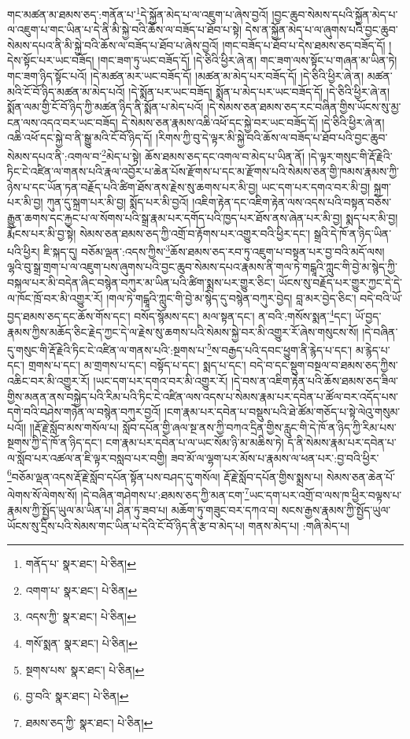 གང་མཚན་མ་ཐམས་ཅད་:གནོན་པ་\footnote{གནོད་པ་  སྣར་ཐང་།  པེ་ཅིན། }དེ་སྐྱོན་མེད་པ་ལ་འཇུག་པ་ཞེས་བྱའོ། །བྱང་ཆུབ་སེམས་དཔའི་སྐྱོན་མེད་པ་ལ་འཇུག་པ་གང་ཡིན་པ་དེ་ནི་མི་སྐྱེ་བའི་ཆོས་ལ་བཟོད་པ་ཐོབ་པ་སྟེ། དེས་ན་སྐྱོན་མེད་པ་ལ་ཞུགས་པའི་བྱང་ཆུབ་སེམས་དཔའ་ནི་མི་སྐྱེ་བའི་ཆོས་ལ་བཟོད་པ་ཐོབ་པ་ཞེས་བྱའོ། །གང་བཟོད་པ་ཐོབ་པ་དེས་ཐམས་ཅད་བཟོད་དོ། །དེས་སྟོང་པར་ཡང་བཟོད། །གང་ཟག་ཏུ་ཡང་བཟོད་དོ། །དེ་ཅིའི་ཕྱིར་ཞེ་ན། གང་ཟག་ལས་སྟོང་པ་གཞན་མ་ཡིན་ཏེ། གང་ཟག་ཉིད་སྟོང་པའོ། །དེ་མཚན་མར་ཡང་བཟོད་དོ། །མཚན་མ་མེད་པར་བཟོད་དོ། །དེ་ཅིའི་ཕྱིར་ཞེ་ན། མཚན་མའི་ངོ་བོ་ཉིད་མཚན་མ་མེད་པའོ། །དེ་སྨོན་པར་ཡང་བཟོད། སྨོན་པ་མེད་པར་ཡང་བཟོད་དོ། །དེ་ཅིའི་ཕྱིར་ཞེ་ན། སྨོན་ལམ་གྱི་ངོ་བོ་ཉིད་ཀྱི་མཚན་ཉིད་ནི་སྨོན་པ་མེད་པའོ། །དེ་སེམས་ཅན་ཐམས་ཅད་རང་བཞིན་གྱིས་ཡོངས་སུ་མྱ་ངན་ལས་འདའ་བར་ཡང་བཟོད། དེ་སེམས་ཅན་རྣམས་འཆི་འཕོ་དང་སྐྱེ་བར་ཡང་བཟོད་དོ། །དེ་ཅིའི་ཕྱིར་ཞེ་ན། འཆི་འཕོ་དང་སྐྱེ་བ་ནི་སྒྱུ་མའི་ངོ་བོ་ཉིད་དོ། །རིགས་ཀྱི་བུ་དེ་ལྟར་མི་སྐྱེ་བའི་ཆོས་ལ་བཟོད་པ་ཐོབ་པའི་བྱང་ཆུབ་སེམས་དཔའ་ནི་:འགལ་བ་\footnote{འགག་པ་  སྣར་ཐང་།  པེ་ཅིན། }མེད་པ་སྟེ། ཆོས་ཐམས་ཅད་དང་འགལ་བ་མེད་པ་ཡིན་ནོ། །དེ་ལྟར་གསུང་གི་རྡོ་རྗེའི་ཏིང་ངེ་འཛིན་ལ་གནས་པའི་རྣལ་འབྱོར་པ་ཆེན་པོས་རྫོགས་པ་དང་མ་རྫོགས་པའི་སེམས་ཅན་གྱི་ཁམས་རྣམས་ཀྱི་ཉེས་པ་དང་ཡོན་ཏན་བརྗོད་པའི་ཚིག་ཐོས་ནས་རྗེས་སུ་ཆགས་པར་མི་བྱ། ཡང་དག་པར་དགའ་བར་མི་བྱ། སྐྲག་པར་མི་བྱ། ཀུན་དུ་སྐྲག་པར་མི་བྱ། སྨོད་པར་མི་བྱའོ། །འཇིག་རྟེན་དང་འཇིག་རྟེན་ལས་འདས་པའི་བསྟན་བཅོས་རྒྱུན་ཆགས་དང་རྐྱང་པ་ལ་སོགས་པའི་སྒྲ་རྣམ་པར་དགོད་པའི་ཁྱད་པར་ཐོས་ནས་ཞེན་པར་མི་བྱ། སྨད་པར་མི་བྱ། རྨོངས་པར་མི་བྱ་སྟེ། སེམས་ཅན་ཐམས་ཅད་ཀྱི་འགྲོ་བ་རྟོགས་པར་འགྱུར་བའི་ཕྱིར་དང་། སྒྲའི་དེ་ཁོ་ན་ཉིད་ཡིན་པའི་ཕྱིར། ཇི་སྐད་དུ། བཅོམ་ལྡན་:འདས་ཀྱིས་\footnote{འདས་ཀྱི་  སྣར་ཐང་།  པེ་ཅིན། }ཆོས་ཐམས་ཅད་རབ་ཏུ་འཇུག་པ་བསྟན་པར་བྱ་བའི་མདོ་ལས། ལྷའི་བུ་སྒྲ་གྲག་པ་ལ་འཇུག་པས་ཞུགས་པའི་བྱང་ཆུབ་སེམས་དཔའ་རྣམས་ནི་གལ་ཏེ་གངྒཱའི་ཀླུང་གི་བྱེ་མ་སྙེད་ཀྱི་བསྐལ་པར་མི་བདེན་ཞིང་བསྙེན་བཀུར་མ་ཡིན་པའི་ཚིག་སྨྲས་པར་གྱུར་ཅིང་། ཡོངས་སུ་བརྗོད་པར་གྱུར་ཀྱང་དེ་དེ་ལ་ཁོང་ཁྲོ་བར་མི་འགྱུར་རོ། །གལ་ཏེ་གངྒཱའི་ཀླུང་གི་བྱེ་མ་སྙེད་དུ་བསྙེན་བཀུར་བྱེད། བླ་མར་བྱེད་ཅིང་། བདེ་བའི་ཡོ་བྱད་ཐམས་ཅད་དང་ཆོས་གོས་དང་། བསོད་སྙོམས་དང་། མལ་སྟན་དང་། ན་བའི་:གསོས་སྨན་\footnote{གསོ་སྨན་  སྣར་ཐང་།  པེ་ཅིན། }དང་། ཡོ་བྱད་རྣམས་ཀྱིས་མཆོད་ཅིང་རྗེད་ཀྱང་དེ་ལ་རྗེས་སུ་ཆགས་པའི་སེམས་སྐྱེ་བར་མི་འགྱུར་རོ་ཞེས་གསུངས་སོ། །དེ་བཞིན་དུ་གསུང་གི་རྡོ་རྗེའི་ཏིང་ངེ་འཛིན་ལ་གནས་པའི་:སྔགས་པ་\footnote{སྔགས་པས་  སྣར་ཐང་།  པེ་ཅིན། }ས་བརྒྱད་པའི་དབང་ཕྱུག་ནི་རྙེད་པ་དང་། མ་རྙེད་པ་དང་། གྲགས་པ་དང་། མ་གྲགས་པ་དང་། བསྟོད་པ་དང་། སྨད་པ་དང་། བདེ་བ་དང་སྡུག་བསྔལ་བ་ཐམས་ཅད་ཀྱིས་འཆིང་བར་མི་འགྱུར་རོ། །ཡང་དག་པར་དགའ་བར་མི་འགྱུར་རོ། །དེ་བས་ན་འཇིག་རྟེན་པའི་ཆོས་ཐམས་ཅད་ཟིལ་གྱིས་མནན་ནས་བསྐྱེད་པའི་རིམ་པའི་ཏིང་ངེ་འཛིན་ལས་འདས་པ་སེམས་རྣམ་པར་དབེན་པ་ཚོལ་བར་འདོད་པས་དགེ་བའི་བཤེས་གཉེན་ལ་བསྙེན་བཀུར་བྱའོ། །ངག་རྣམ་པར་དབེན་པ་བསྡུས་པའི་ཐེ་ཚོམ་གཅོད་པ་སྟེ་ལེའུ་གསུམ་པའོ།། །།རྡོ་རྗེ་སློབ་མས་གསོལ་པ། སློབ་དཔོན་གྱི་ཞལ་སྔ་ནས་ཀྱི་བཀའ་དྲིན་གྱིས་རླུང་གི་དེ་ཁོ་ན་ཉིད་ཀྱི་རིམ་པས་སྔགས་ཀྱི་དེ་ཁོ་ན་ཉིད་དང་། ངག་རྣམ་པར་དབེན་པ་ལ་ཡང་སོམ་ཉི་མ་མཆིས་ཏེ། ད་ནི་སེམས་རྣམ་པར་དབེན་པ་ལ་སློབ་པར་འཚལ་ན་ཇི་ལྟར་བསླབ་པར་བགྱི། ཟབ་མོ་ལ་ལྷག་པར་མོས་པ་རྣམས་ལ་ཕན་པར་:བྱ་བའི་ཕྱིར་\footnote{བྱ་བའི་  སྣར་ཐང་།  པེ་ཅིན། }བཅོམ་ལྡན་འདས་རྡོ་རྗེ་སློབ་དཔོན་སྟོན་པས་བཤད་དུ་གསོལ། རྡོ་རྗེ་སློབ་དཔོན་གྱིས་སྨྲས་པ། སེམས་ཅན་ཆེན་པོ་ལེགས་སོ་ལེགས་སོ། །དེ་བཞིན་གཤེགས་པ་:ཐམས་ཅད་ཀྱི་མན་ངག་\footnote{ཐམས་ཅད་ཀྱི་  སྣར་ཐང་།  པེ་ཅིན། }ཡང་དག་པར་འགྲོ་བ་ལས་ཁ་ཕྱིར་བལྟས་པ་རྣམས་ཀྱི་སྤྱོད་ཡུལ་མ་ཡིན་པ། ཤིན་ཏུ་ཟབ་པ། མཆོག་ཏུ་གཟུང་བར་དཀའ་བ། སངས་རྒྱས་རྣམས་ཀྱི་སྤྱོད་ཡུལ་ཡོངས་སུ་དྲིས་པའི་སེམས་གང་ཡིན་པ་དེའི་ངོ་བོ་ཉིད་ནི་རྩ་བ་མེད་པ། གནས་མེད་པ། :གཞི་མེད་པ། 